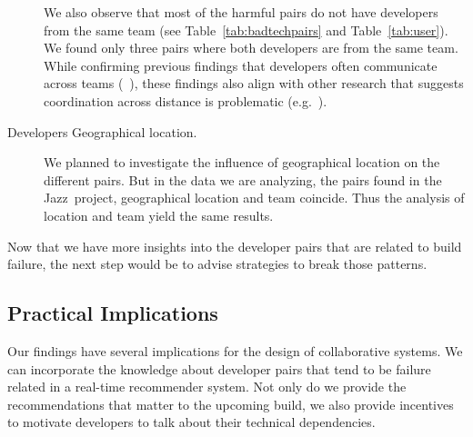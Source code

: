 \documentclass{sig-alternate}
\begin{document}
\begin{description}
We also observe that most of the harmful pairs do not have developers from the
same team (see Table~\ref{tab:badtechpairs} and Table~\ref{tab:user}). We found
only three pairs where both developers are from the same team. While confirming
previous findings that developers often communicate across teams
(~\cite{ehrlich:icgse:2006}), these findings also align with other research that
suggests coordination across distance is problematic
(e.g.~\cite{grinter:group:1999,curtis:acm:1988, ehrlich:icgse:2006}).

\item[Developers Geographical location.]
We planned to investigate the influence of geographical location on the different pairs.
But in the data we are analyzing, the pairs found in the Jazz\texttrademark\ project, geographical location and team coincide.
Thus the analysis of location and team yield the same results. 

\end{description}


Now that we have more insights into the developer pairs that are related to build failure, the next step would be to advise strategies to break those patterns.

\subsection{Practical Implications}

Our findings
have several implications for the design of collaborative systems. 
%
We can incorporate the knowledge about developer pairs that tend to be failure related in a real-time recommender system.
Not only do we provide the recommendations that matter to the upcoming build, we
also provide incentives to motivate developers to talk about their technical dependencies.
%
\end{document}
